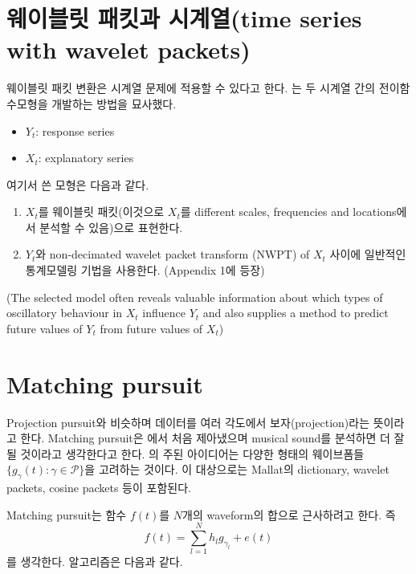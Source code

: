 \documentclass[b5paper,]{scrbook}
\theoremstyle{plain}
\theoremstyle{definition}
\numberwithin{equation}{section}
\begin{document}
\hypertarget{--time-series-with-wavelet-packets}{%
\section{웨이블릿 패킷과 시계열(time series with wavelet packets)}\label{--time-series-with-wavelet-packets}}

웨이블릿 패킷 변환은 시계열 문제에 적용할 수 있다고 한다. \citep{Nason2002}는 두 시계열 간의 전이함수모형을 개발하는 방법을 묘사했다.

\begin{itemize}
\item
  \(Y_{t}\): response series
\item
  \(X_{t}\): explanatory series
\end{itemize}

여기서 쓴 모형은 다음과 같다.

\begin{enumerate}
\def\labelenumi{\arabic{enumi}.}
\item
  \(X_{t}\)를 웨이블릿 패킷(이것으로 \(X_{t}\)를 different scales, frequencies and locations에서 분석할 수 있음)으로 표현한다.
\item
  \(Y_{t}\)와 non-decimated wavelet packet transform (NWPT) of \(X_{t}\) 사이에 일반적인 통계모델링 기법을 사용한다. (Appendix 1에 등장)
\end{enumerate}

(The selected model often reveals valuable information about which types of oscillatory behaviour in \(X_{t}\) influence \(Y_{t}\) and also supplies a method to predict future values of \(Y_{t}\) from future values of \(X_{t}\))

\hypertarget{matching-pursuit}{%
\section{Matching pursuit}\label{matching-pursuit}}

Projection pursuit와 비슷하며 데이터를 여러 각도에서 보자(projection)라는 뜻이라고 한다. Matching pursuit은 \citep{Mallat1993}에서 처음 제아냈으며 musical sound를 분석하면 더 잘 될 것이라고 생각한다고 한다. \citep{Mallat1993}의 주된 아이디어는 다양한 형태의 웨이브폼들 \(\{g_{\gamma}(t):\gamma \in\mathcal{P}\}\)을 고려하는 것이다. 이 대상으로는 Mallat의 dictionary, wavelet packets, cosine packets 등이 포함된다.

Matching pursuit는 함수 \(f(t)\)를 \(N\)개의 waveform의 합으로 근사하려고 한다. 즉
\[f(t)=\sum_{l=1}^{N}h_{l}g_{\gamma_{l}}+e(t)\]
를 생각한다. 알고리즘은 다음과 같다.
\end{document}
